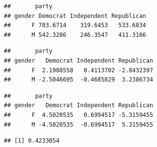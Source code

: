 \documentclass[
]{book}
\newenvironment{Shaded}{\begin{snugshade}}{\end{snugshade}}
\newcommand{\AttributeTok}[1]{\textcolor[rgb]{0.77,0.63,0.00}{#1}}
\newcommand{\CommentTok}[1]{\textcolor[rgb]{0.56,0.35,0.01}{\textit{#1}}}
\newcommand{\ConstantTok}[1]{\textcolor[rgb]{0.00,0.00,0.00}{#1}}
\newcommand{\DecValTok}[1]{\textcolor[rgb]{0.00,0.00,0.81}{#1}}
\newcommand{\DocumentationTok}[1]{\textcolor[rgb]{0.56,0.35,0.01}{\textbf{\textit{#1}}}}
\newcommand{\FunctionTok}[1]{\textcolor[rgb]{0.00,0.00,0.00}{#1}}
\newcommand{\NormalTok}[1]{#1}
\newcommand{\OtherTok}[1]{\textcolor[rgb]{0.56,0.35,0.01}{#1}}
\newcommand{\SpecialCharTok}[1]{\textcolor[rgb]{0.00,0.00,0.00}{#1}}
\begin{document}
\begin{verbatim}
##       party
## gender Democrat Independent Republican
##      F 703.6714    319.6453   533.6834
##      M 542.3286    246.3547   411.3166
\end{verbatim}

\begin{Shaded}
\end{Shaded}

\begin{verbatim}
##       party
## gender   Democrat Independent Republican
##      F  2.1988558   0.4113702 -2.8432397
##      M -2.5046695  -0.4685829  3.2386734
\end{verbatim}

\begin{Shaded}
\end{Shaded}

\begin{verbatim}
##       party
## gender   Democrat Independent Republican
##      F  4.5020535   0.6994517 -5.3159455
##      M -4.5020535  -0.6994517  5.3159455
\end{verbatim}

\begin{Shaded}
\end{Shaded}

\begin{verbatim}
## [1] 0.4233054
\end{verbatim}

\begin{Shaded}
\end{Shaded}
\end{document}
